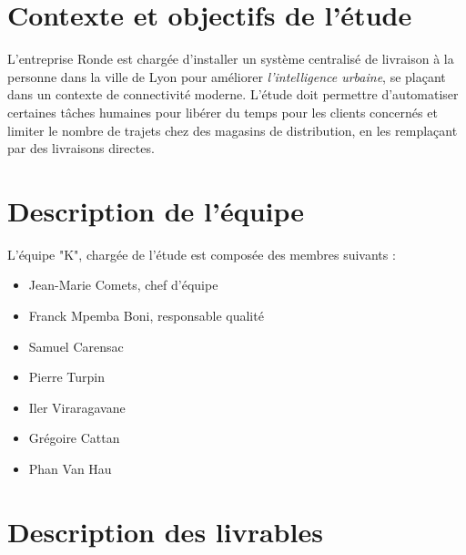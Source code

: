 

\newenvironment{Phase}[3]{
    \subsection{#1}
    \noindent
    \textbf{Fournitures :} #2 \\
    \textbf{Livrables :} #3 \\
}{
}

\newenvironment{SubPhases}{
    \textbf{Sous-phases :}
    \begin{enumerate}
}{
    \end{enumerate}
}




\section{Contexte et objectifs de l'étude}

L'entreprise Ronde est chargée d'installer un système centralisé de livraison à
la personne dans la ville de Lyon pour améliorer \textit{l'intelligence
    urbaine}, se plaçant dans un contexte de connectivité moderne. L'étude doit
permettre d'automatiser certaines tâches humaines pour libérer du temps pour
les clients concernés et limiter le nombre de trajets chez des magasins de
distribution, en les remplaçant par des livraisons directes.

\section{Description de l'équipe}

L'équipe "K", chargée de l'étude est composée des membres suivants :

\begin{itemize}
\item Jean-Marie Comets, chef d'équipe
\item Franck Mpemba Boni, responsable qualité
\item Samuel Carensac
\item Pierre Turpin
\item Iler Viraragavane
\item Grégoire Cattan
\item Phan Van Hau
\end{itemize}

\section{Description des livrables}


